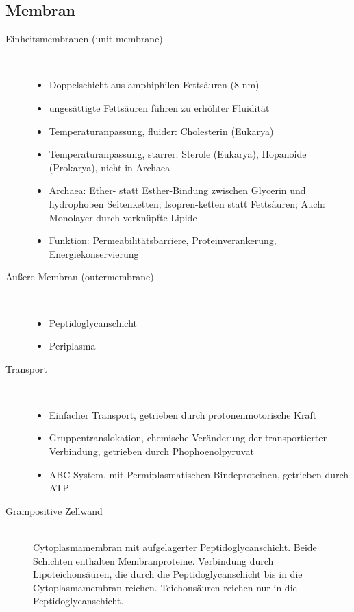 \subsection{Membran}
\begin{description}
	\item[Einheitsmembranen (unit membrane)] \hfill \\
		\begin{itemize}
			\item Doppelschicht aus amphiphilen Fettsäuren (8 nm)
			\item ungesättigte Fettsäuren führen zu erhöhter Fluidität
			\item Temperaturanpassung, fluider: Cholesterin (Eukarya)
			\item Temperaturanpassung, starrer: Sterole (Eukarya), Hopanoide (Prokarya), nicht in Archaea
			\item Archaea: Ether- statt Esther-Bindung zwischen Glycerin und hydrophoben Seitenketten; 
				Isopren-ketten statt Fettsäuren; Auch: Monolayer durch verknüpfte Lipide
			\item Funktion: Permeabilitätsbarriere, Proteinverankerung, Energiekonservierung
		\end{itemize}

	\item[Äußere Membran (outermembrane)] \hfill \\
		\begin{itemize}
			\item Peptidoglycanschicht
			\item Periplasma
		\end{itemize}

	\item[Transport] \hfill \\
		\begin{itemize}
			\item Einfacher Transport, getrieben durch protonenmotorische Kraft
			\item Gruppentranslokation, chemische Veränderung der transportierten Verbindung,
				getrieben durch Phophoenolpyruvat
			\item ABC-System, mit Permiplasmatischen Bindeproteinen,
				getrieben durch ATP
		\end{itemize}

	\item[Grampositive Zellwand] \hfill \\
		Cytoplasmamembran mit aufgelagerter Peptidoglycanschicht.
		Beide Schichten enthalten Membranproteine.
		Verbindung durch Lipoteichonsäuren,
		die durch die Peptidoglycanschicht bis in die Cytoplasmamembran reichen.
		Teichonsäuren reichen nur in die Peptidoglycanschicht.
		

\end{description}
